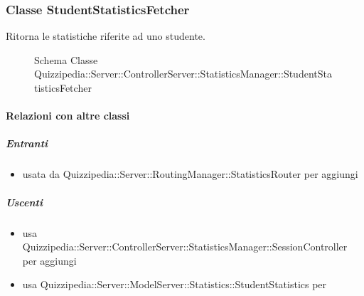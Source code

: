 \subsubsection{Classe StudentStatisticsFetcher}
Ritorna le statistiche riferite ad uno studente.
\begin{figure}[H]
\centering
\noindent{}
\caption[Schema Classe StudentStatisticsFetcher]{Schema Classe Quizzipedia::Server::ControllerServer::StatisticsManager::StudentStatisticsFetcher}
\end{figure}
\paragraph{Relazioni con altre classi}
\subparagraph{Entranti}
\begin{itemize}
\item usata da Quizzipedia::Server::RoutingManager::StatisticsRouter per aggiungi
\end{itemize}
\subparagraph{Uscenti}
\begin{itemize}
\item usa Quizzipedia::Server::ControllerServer::StatisticsManager::SessionController per aggiungi
\item usa Quizzipedia::Server::ModelServer::Statistics::StudentStatistics per 
\end{itemize}

